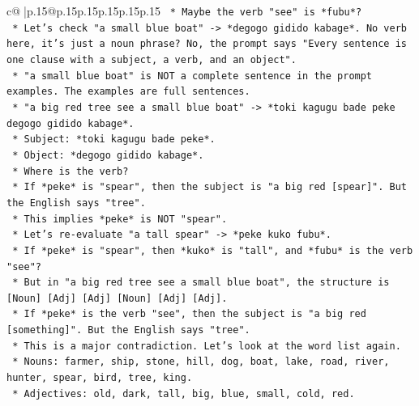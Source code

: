 \documentclass{article}
\begin{document}
{\begin{supertabular}{c@{$\;$}|p{.15\linewidth}@{}p{.15\linewidth}p{.15\linewidth}p{.15\linewidth}p{.15\linewidth}p{.15\linewidth}}
{{{\texttt{                                *   Maybe the verb "see" is *fubu*?} \\
\texttt{                                *   Let's check "a small blue boat" {-}> *degogo gidido kabage*. No verb here, it's just a noun phrase? No, the prompt says "Every sentence is one clause with a subject, a verb, and an object".} \\
\texttt{                                *   "a small blue boat" is NOT a complete sentence in the prompt examples. The examples are full sentences.} \\
\texttt{                                *   "a big red tree see a small blue boat" {-}> *toki kagugu bade peke degogo gidido kabage*.} \\
\texttt{                                    *   Subject: *toki kagugu bade peke*.} \\
\texttt{                                    *   Object: *degogo gidido kabage*.} \\
\texttt{                                    *   Where is the verb?} \\
\texttt{                                    *   If *peke* is "spear", then the subject is "a big red {[}spear{]}". But the English says "tree".} \\
\texttt{                                    *   This implies *peke* is NOT "spear".} \\
\texttt{                                    *   Let's re{-}evaluate "a tall spear" {-}> *peke kuko fubu*.} \\
\texttt{                                        *   If *peke* is "spear", then *kuko* is "tall", and *fubu* is the verb "see"?} \\
\texttt{                                        *   But in "a big red tree see a small blue boat", the structure is {[}Noun{]} {[}Adj{]} {[}Adj{]} {[}Noun{]} {[}Adj{]} {[}Adj{]}.} \\
\texttt{                                        *   If *peke* is the verb "see", then the subject is "a big red {[}something{]}". But the English says "tree".} \\
\texttt{                                        *   This is a major contradiction. Let's look at the word list again.} \\
\texttt{                                        *   Nouns: farmer, ship, stone, hill, dog, boat, lake, road, river, hunter, spear, bird, tree, king.} \\
\texttt{                                        *   Adjectives: old, dark, tall, big, blue, small, cold, red.} \\
}}}
\end{supertabular}}
\end{document}
